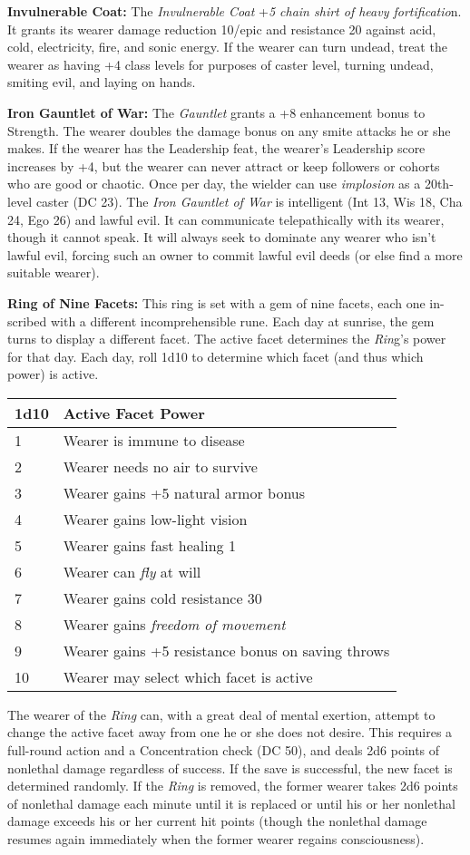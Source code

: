 \documentclass{article}
\begin{document}
\textbf{Invulnerable Coat: }The \textit{Invulnerable Coat }+\textit{5 chain shirt 
of heavy fortificatio}n. It grants its wearer damage reduction 10/epic and resistance 
20 against acid, cold, electricity, fire, and sonic energy. If the wearer can turn 
undead, treat the wearer as having +4 class levels for purposes of caster level, 
turning undead, smiting evil, and laying on hands. 

\textbf{Iron Gauntlet of War: }The \textit{Gauntlet }grants a +8 enhancement bonus 
to Strength. The wearer doubles the damage bonus on any smite attacks he or she 
makes. If the wearer has the Leadership feat, the wearer's Leadership score increases 
by +4, but the wearer can never attract or keep followers or cohorts who are good 
or chaotic. Once per day, the wielder can use \textit{implosion }as a 20th-level 
caster (DC 23). The \textit{Iron Gauntlet of War }is intelligent (Int 13, Wis 18, 
Cha 24, Ego 26) and lawful evil. It can communicate telepathically with its wearer, 
though it cannot speak. It will always seek to dominate any wearer who isn't lawful 
evil, forcing such an owner to commit lawful evil deeds (or else find a more suitable 
wearer). 

\textbf{Ring of Nine Facets: }This ring is set with a gem of nine facets, each 
one in-scribed with a different incomprehensible rune. Each day at sunrise, the 
gem turns to display a different facet. The active facet determines the \textit{Rin}g's 
power for that day. Each day, roll 1d10 to determine which facet (and thus which 
power) is active.

\vspace{12pt}
\begin{tabular}{|>{\raggedright}p{19pt}|>{\raggedright}p{204pt}|}
\hline
1\textbf{d10} & A\textbf{ctive Facet Power }\tabularnewline
\hline
1  & Wearer is immune to disease \tabularnewline
\hline
2  & Wearer needs no air to survive \tabularnewline
\hline
3  & Wearer gains +5 natural armor bonus \tabularnewline
\hline
4  & Wearer gains low-light vision \tabularnewline
\hline
5  & Wearer gains fast healing 1 \tabularnewline
\hline
6  & Wearer can \textit{fly }at will \tabularnewline
\hline
7  & Wearer gains cold resistance 30 \tabularnewline
\hline
8  & Wearer gains \textit{freedom of movement }\tabularnewline
\hline
9  & Wearer gains +5 resistance bonus on saving throws \tabularnewline
\hline
10  & Wearer may select which facet is active \tabularnewline
\hline
\end{tabular}

\vspace{12pt}
The wearer of the \textit{Ring }can, with a great deal of mental exertion, attempt 
to change the active facet away from one he or she does not desire. This requires 
a full-round action and a Concentration check (DC 50), and deals 2d6 points of 
nonlethal damage regardless of success. If the save is successful, the new facet 
is determined randomly. If the \textit{Ring }is removed, the former wearer takes 
2d6 points of nonlethal damage each minute until it is replaced or until his or 
her nonlethal damage exceeds his or her current hit points (though the nonlethal 
damage resumes again immediately when the former wearer regains consciousness).

\newpage
\end{document}
